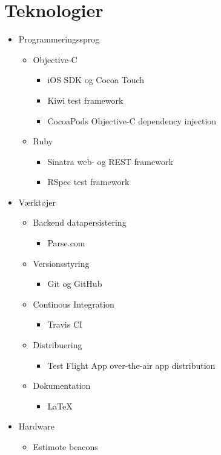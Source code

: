 \chapter{Teknologier}
\label{ch:teknologier}

\begin{itemize}
\item Programmeringssprog
	\begin{itemize}
		\item Objective-C
			\begin{itemize}
				\item iOS SDK og Cocoa Touch
				\item Kiwi test framework
				\item CocoaPods Objective-C dependency injection
			\end{itemize}
		
		\item Ruby
			\begin{itemize}
				\item Sinatra web- og REST framework
				\item RSpec test framework
			\end{itemize}
	\end{itemize}
\item Værktøjer
	\begin{itemize}
		\item Backend datapersistering
			\begin{itemize}
				\item Parse.com
			\end{itemize}
		
		\item Versionsstyring
			\begin{itemize}
				\item Git og GitHub
			\end{itemize}
		
		\item Continous Integration
			\begin{itemize}
				\item Travis CI
			\end{itemize}
		
		\item Distribuering
			\begin{itemize}
				\item Test Flight App over-the-air app distribution
			\end{itemize}
		
		\item Dokumentation
			\begin{itemize}
				\item{LaTeX}
			\end{itemize}	
	\end{itemize}
\item Hardware
	\begin{itemize}
		\item Estimote beacons
	\end{itemize}
	\end{itemize}